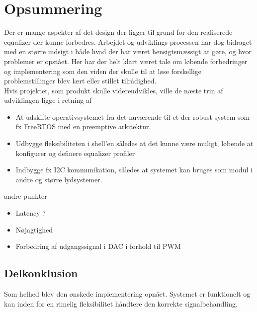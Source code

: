 \section{Opsummering}
Der er mange aspekter af det design der ligger til grund for den realiserede equalizer der kunne forbedres.
Arbejdet og udviklings processen har dog bidraget med en større indsigt i både hvad der har været hensigtsmæssigt at gøre, og hvor problemer er opstået.
Her har der helt klart været tale om løbende forbedringer og implementering som den viden der skulle til at løse forskellige problemstillinger blev lært eller stillet tilrådighed.\\

Hvis projektet, som produkt skulle videreudvikles, ville de næste trin af udviklingen ligge i retning af
\begin{itemize}
	\item At udskifte operativsystemet fra det nuværende til et der robust system som fx FreeRTOS med en preemptive arkitektur.
	\item Udbygge fleksibiliteten i shell'en således at det kunne være muligt, løbende at konfigurer og definere equalizer profiler
	\item Indbygge fx I2C kommunikation, således at systemet kan bruges som modul i andre og større lydsystemer.
\end{itemize} 

andre punkter
\begin{itemize}
	\item Latency ?
	\item Nøjagtighed
	\item Forbedring af udgangssignal i DAC i forhold til PWM
\end{itemize}

\subsection{Delkonklusion}
Som helhed blev den ønskede implementering opnået.
Systemet er funktionelt og kan inden for en rimelig fleksibilitet håndtere den korrekte signalbehandling.

